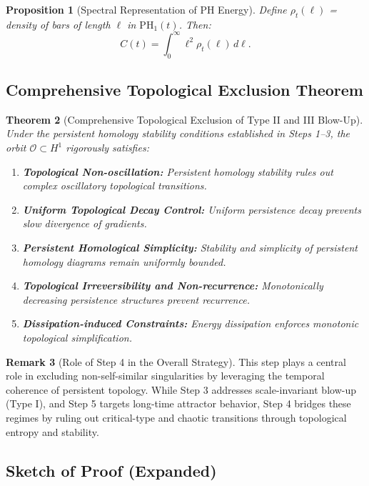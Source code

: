 \documentclass[11pt]{article}
\newtheorem{theorem}{Theorem}[section]
\newtheorem{proposition}[theorem]{Proposition}
\theoremstyle{definition}
\newtheorem{remark}[theorem]{Remark}
\begin{document}
\begin{proposition}[Spectral Representation of PH Energy]
Define $\rho_t(\ell)$ = density of bars of length $\ell$ in $\mathrm{PH}_1(t)$. Then:
\[
C(t) = \int_0^\infty \ell^2 \rho_t(\ell) \, d\ell.
\]
\end{proposition}

\subsection*{Comprehensive Topological Exclusion Theorem}

\begin{theorem}[Comprehensive Topological Exclusion of Type II and III Blow-Up]
\label{thm:comprehensive_exclusion}
Under the persistent homology stability conditions established in Steps 1--3, the orbit $\mathcal{O} \subset H^1$ rigorously satisfies:
\begin{enumerate}
  \item \textbf{Topological Non-oscillation:} Persistent homology stability rules out complex oscillatory topological transitions.
  \item \textbf{Uniform Topological Decay Control:} Uniform persistence decay prevents slow divergence of gradients.
  \item \textbf{Persistent Homological Simplicity:} Stability and simplicity of persistent homology diagrams remain uniformly bounded.
  \item \textbf{Topological Irreversibility and Non-recurrence:} Monotonically decreasing persistence structures prevent recurrence.
  \item \textbf{Dissipation-induced Constraints:} Energy dissipation enforces monotonic topological simplification.
\end{enumerate}
\end{theorem}

\begin{remark}[Role of Step 4 in the Overall Strategy]
This step plays a central role in excluding non-self-similar singularities by leveraging the temporal coherence of persistent topology. While Step 3 addresses scale-invariant blow-up (Type I), and Step 5 targets long-time attractor behavior, Step 4 bridges these regimes by ruling out critical-type and chaotic transitions through topological entropy and stability.
\end{remark}

\subsection*{Sketch of Proof (Expanded)}
\end{document}
